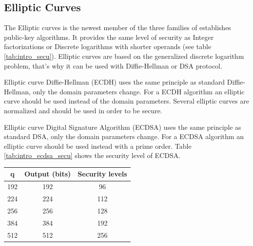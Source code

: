 \subsection*{Elliptic Curves}

The Elliptic curves is the newest member of the three families of establishes
public-key algorithms. It provides the same level of security as Integer
factorizations or Discrete logarithms with shorter operands (see table
\ref{tab:intro_secu}). Elliptic curves are based on the generalized discrete
logarithm problem, that's why it can be used with Diffie-Hellman or DSA
protocol.

Elliptic curve Diffie-Hellman (ECDH) uses the same principle as standard
Diffie-Hellman, only the domain parameters change. For a ECDH algorithm an
elliptic curve should be used instead of the domain parameters. Several
elliptic curves are normalized \cite{RFC4492} and should be used in order to be
secure.

Elliptic curve Digital Signature Algorithm (ECDSA) uses the same principle as
standard DSA, only the domain parameters change. For a ECDSA algorithm an
elliptic curve should be used instead with a prime order. Table
\ref{tab:intro_ecdsa_secu} shows the security level of ECDSA.\newline

\begin{center}
\begin{tabular}{|*{3}{c|}}

\hline
q	& Output (bits)	& Security levels \\
\hline
192	& 192			&	96  \\
224	& 224 			&	112 \\
256	& 256 			& 	128	\\
384 & 384			&  	192 \\
512	& 512			&	256 \\
\hline

\end{tabular}
\label{tab:intro_ecdsa_secu}

\end{center}

\newpage